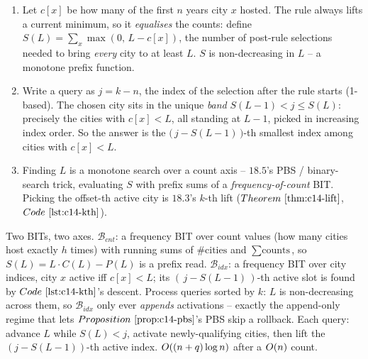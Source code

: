 \begin{enumerate}[nosep,leftmargin=1.6em]
  \item Let \(c[x]\) be how many of the first \(n\) years city \(x\) hosted.
        The rule always lifts a current minimum, so it \emph{equalises} the
        counts: define \(S(L)=\sum_x \max(0,\,L-c[x])\), the number of post-rule
        selections needed to bring \emph{every} city to at least \(L\). \(S\) is
        non-decreasing in \(L\) -- a monotone prefix function.
  \item Write a query as \(j=k-n\), the index of the selection after the rule
        starts (1-based). The chosen city sits in the unique \emph{band}
        \(S(L-1)<j\le S(L)\): precisely the cities with \(c[x]<L\), all standing
        at \(L-1\), picked in increasing index order. So the answer is the
        \(\big(\,j-S(L-1)\,\big)\)-th smallest index among cities with \(c[x]<L\).
  \item Finding \(L\) is a monotone search over a count axis -- \(18.5\)'s PBS /
        binary-search trick, evaluating \(S\) with prefix sums of a
        \emph{frequency-of-count} BIT. Picking the offset-th active city is
        \(18.3\)'s \(k\)-th lift (\(\thmref{c14-lift}\), \(\coderef{c14-kth}\)).
\end{enumerate}

Two BITs, two axes. \(\mathcal{B}_{\mathit{cnt}}\): a frequency BIT over count
values (how many cities host exactly \(h\) times) with running sums of
\(\#\text{cities}\) and \(\sum\text{counts}\), so \(S(L)=L\cdot C(L)-P(L)\) is a
prefix read. \(\mathcal{B}_{\mathit{idx}}\): a frequency BIT over city indices,
city \(x\) active iff \(c[x]<L\); its \((\,j-S(L-1)\,)\)-th active slot is found
by \(\coderef{c14-kth}\)'s descent. Process queries sorted by \(k\): \(L\) is
non-decreasing across them, so \(\mathcal{B}_{\mathit{idx}}\) only ever
\emph{appends} activations -- exactly the append-only regime that lets
\(\propref{c14-pbs}\)'s PBS skip a rollback. Each query: advance \(L\) while
\(S(L)<j\), activate newly-qualifying cities, then lift the
\((j-S(L-1))\)-th active index. \(O((n+q)\log n)\) after a \(O(n)\) count.


